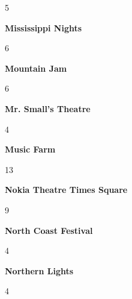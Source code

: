 \begin{center}5\end{center} 
\newline 
\begin{center}\textbf{Mississippi Nights}\end{center}
\begin{center}6\end{center} 
\newline 
\begin{center}\textbf{Mountain Jam}\end{center}
\begin{center}6\end{center} 
\newline 
\begin{center}\textbf{Mr. Small's Theatre}\end{center}
\begin{center}4\end{center} 
\newline 
\begin{center}\textbf{Music Farm}\end{center}
\begin{center}13\end{center} 
\newline 
\begin{center}\textbf{Nokia Theatre Times Square}\end{center}
\begin{center}9\end{center} 
\newline 
\begin{center}\textbf{North Coast Festival}\end{center}
\begin{center}4\end{center} 
\newline 
\begin{center}\textbf{Northern Lights}\end{center}
\begin{center}4\end{center} 
\newline 
